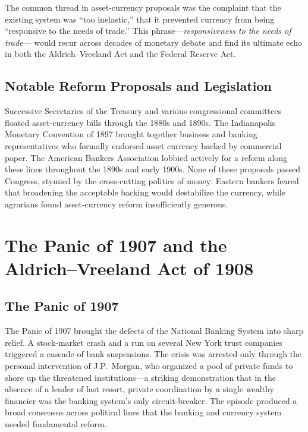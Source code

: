 \documentclass[12pt]{article}
\begin{document}
The common thread in asset-currency proposals was the complaint that the existing
system was ``too inelastic,'' that it prevented currency from being ``responsive to
the needs of trade.''  This phrase---\emph{responsiveness to the needs of trade}---
would recur across decades of monetary debate and find its ultimate echo in both
the Aldrich--Vreeland Act and the Federal Reserve Act.

\subsection{Notable Reform Proposals and Legislation}

Successive Secretaries of the Treasury and various congressional committees floated
asset-currency bills through the 1880s and 1890s.  The Indianapolis Monetary
Convention of 1897 brought together business and banking representatives who formally
endorsed asset currency backed by commercial paper.  The American Bankers
Association lobbied actively for a reform along these lines throughout the 1890s
and early 1900s.  None of these proposals passed Congress, stymied by the
cross-cutting politics of money: Eastern bankers feared that broadening the
acceptable backing would destabilize the currency, while agrarians found
asset-currency reform insufficiently generous.

\section{The Panic of 1907 and the Aldrich--Vreeland Act of 1908}
\label{sec:aldrich-vreeland}

\subsection{The Panic of 1907}

The Panic of 1907 brought the defects of the National Banking System into sharp
relief.  A stock-market crash and a run on several New York trust companies
triggered a cascade of bank suspensions.  The crisis was arrested only through the
personal intervention of J.P.\ Morgan, who organized a pool of private funds to
shore up the threatened institutions---a striking demonstration that in the
absence of a lender of last resort, private coordination by a single wealthy
financier was the banking system's only circuit-breaker.  The episode produced a broad
consensus across political lines that the banking and currency system needed
fundamental reform.
\end{document}
